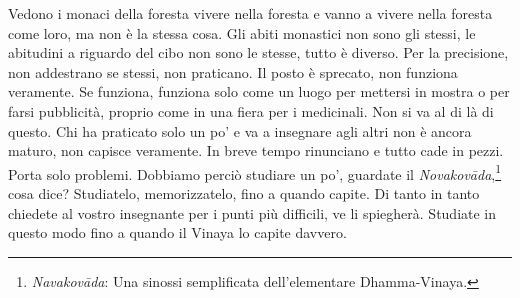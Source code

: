 Vedono i monaci della foresta vivere nella foresta e vanno a vivere
nella foresta come loro, ma non è la stessa cosa. Gli abiti monastici
non sono gli stessi, le abitudini a riguardo del cibo non sono le
stesse, tutto è diverso. Per la precisione, non addestrano se stessi,
non praticano. Il posto è sprecato, non funziona veramente. Se funziona,
funziona solo come un luogo per mettersi in mostra o per farsi
pubblicità, proprio come in una fiera per i medicinali. Non si va al di
là di questo. Chi ha praticato solo un po' e va a insegnare agli altri
non è ancora maturo, non capisce veramente. In breve tempo rinunciano e
tutto cade in pezzi. Porta solo problemi. Dobbiamo perciò studiare un
po', guardate il \emph{Novakovāda},\footnote{\emph{Navakovāda}: Una
  sinossi semplificata dell'elementare Dhamma-Vinaya.} cosa dice?
Studiatelo, memorizzatelo, fino a quando capite. Di tanto in tanto
chiedete al vostro insegnante per i punti più difficili, ve li
spiegherà. Studiate in questo modo fino a quando il Vinaya lo capite
davvero.

